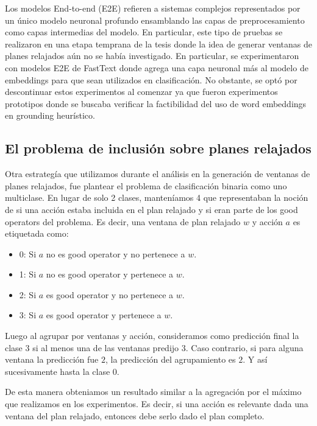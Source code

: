 Los modelos End-to-end (E2E) refieren a sistemas complejos representados por un único
modelo neuronal profundo ensamblando las capas de preprocesamiento como capas
intermedias del modelo. En particular, este tipo de pruebas se realizaron en una
etapa temprana de la tesis donde la idea de generar ventanas de planes relajados
aún no se había investigado. En particular, se experimentaron con modelos E2E de
FastText donde agrega una capa neuronal más al modelo de embeddings para que
sean utilizados en clasificación. No obstante, se optó por descontinuar estos
experimentos al comenzar ya que fueron experimentos prototipos donde se buscaba
verificar la factibilidad del uso de word embeddings en grounding heurístico.

\subsection{El problema de inclusión sobre planes relajados}

Otra estrategía que utilizamos durante el análisis en la generación de ventanas
de planes relajados, fue plantear el problema de clasificación binaria como uno
multiclase. En lugar de solo 2 clases, manteníamos 4 que representaban la noción
de si una acción estaba incluida en el plan relajado y si eran parte de los good
operators del problema. Es decir, una ventana de plan relajado $w$ y acción $a$
es etiquetada como:

\begin{itemize}
    \item 0: Si $a$ no es good operator y no pertenece a $w$.
    \item 1: Si $a$ no es good operator y pertenece a $w$.
    \item 2: Si $a$ es good operator y no pertenece a $w$.
    \item 3: Si $a$ es good operator y pertenece a $w$.
\end{itemize}

Luego al agrupar por ventanas y acción, consideramos como predicción final la
clase $3$ si al menos una de las ventanas predijo $3$. Caso contrario, si para
alguna ventana la predicción fue $2$, la predicción del agrupamiento es $2$. Y así
sucesivamente hasta la clase $0$.

De esta manera obteniamos un resultado similar a la agregación por el máximo que
realizamos en los experimentos. Es decir, si una acción es relevante dada una
ventana del plan relajado, entonces debe serlo dado el plan completo.

